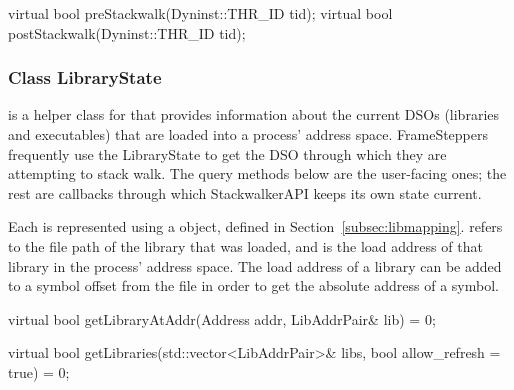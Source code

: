 \begin{apient}
virtual bool preStackwalk(Dyninst::THR_ID tid);
virtual bool postStackwalk(Dyninst::THR_ID tid);
\end{apient}

\subsubsection{Class LibraryState}
\label{subsubsec:librarystate}


 is a helper class for  that provides information about
the current DSOs (libraries and executables) that are loaded into a process'
address space. FrameSteppers frequently use the LibraryState to get the DSO
through which they are attempting to stack walk.  The query methods below are
the user-facing ones; the rest are callbacks through which StackwalkerAPI keeps
its own state current.

Each  is represented using a  object, defined in
Section~\ref{subsec:libmapping}.   refers to the file path
of the library that was loaded, and  is the load address
of that library in the process' address space.  The load address of a library can
be added to a symbol offset from the file in order to get the absolute address of
a symbol.

\begin{apient}
virtual bool getLibraryAtAddr(Address addr, LibAddrPair& lib) = 0;
\end{apient}

\begin{apient}
virtual bool getLibraries(std::vector<LibAddrPair>& libs,
                          bool allow_refresh = true) = 0;
\end{apient}

